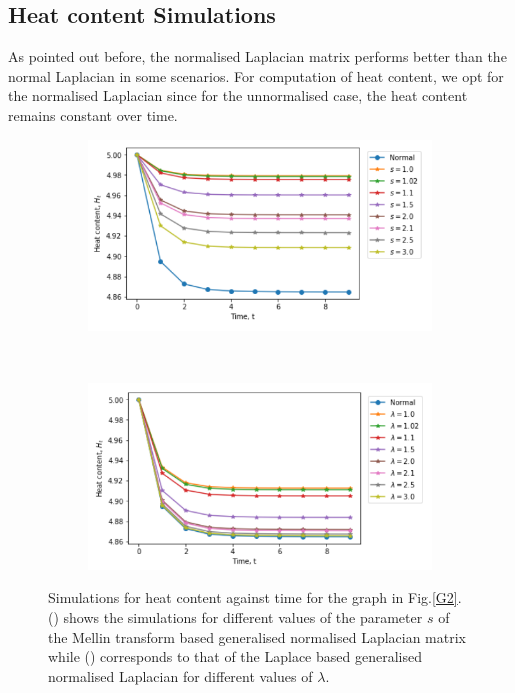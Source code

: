 \documentclass[10pt,a4paper]{article}
\theoremstyle{plain}
\theoremstyle{definition}
\begin{document}
  \subsection{Heat content Simulations}
   As pointed out before, the normalised Laplacian matrix performs better than the normal Laplacian in some scenarios. For computation of heat content, we opt for the normalised Laplacian since for the unnormalised case, the heat content remains constant over time.
    \begin{figure}[H]
    	\centering
    	\begin{subfigure}[b]{0.5\textwidth}
    		\includegraphics[width= \textwidth]{images/Mellin-heatcontent.png}
    		\caption{}
    		\label{mellin-heatcont}
    	\end{subfigure}~
    	\begin{subfigure}[b]{0.5\textwidth}
    		\includegraphics[width= \textwidth]{images/Laplace-heatcontent.png}
    		\caption{ }
    		\label{laplace-heatcont}
    	\end{subfigure}
    	\caption{Simulations for heat content against time for the graph in Fig.\ref{G2}. () shows the simulations for different values of the parameter $s$ of the Mellin transform based generalised normalised Laplacian matrix while () corresponds to that of the Laplace based generalised normalised Laplacian for different values of $\lambda$. }
    	\label{}
    \end{figure}
\end{document}
